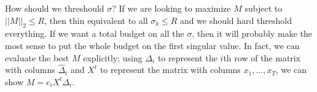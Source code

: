 \documentclass[11pt]{article}
\begin{document}
  How should we threshould $\sigma$? If we are looking to maximize $M$ subject to $||M||_2\leq R$, then thin equivalent to all $\sigma_k \leq R$ and we should hard threshold everything. If we want a total budget on all the $\sigma$, then it will probably make the most sense to put the whole budget on the first singular value. In fact, we can evaluate the best $M$ explicitly; using $\Delta_i$ to represent the $i$th row of the matrix with columns $\hat\Delta_t$ and $X^t$ to represent the matrix with columns $x_1,\ldots, x_T$, we can show $M = e_i X^t\Delta_i$.





\end{document}
